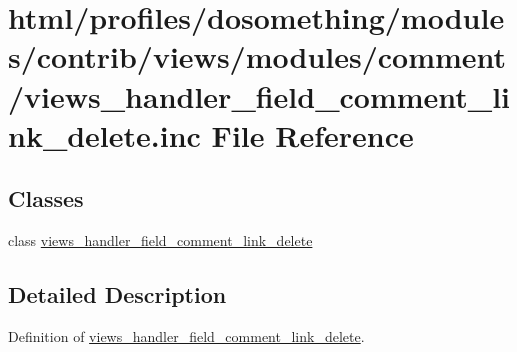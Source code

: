 \hypertarget{views__handler__field__comment__link__delete_8inc}{
\section{html/profiles/dosomething/modules/contrib/views/modules/comment/views\_\-handler\_\-field\_\-comment\_\-link\_\-delete.inc File Reference}
\label{views__handler__field__comment__link__delete_8inc}
}
\subsection*{Classes}
\begin{DoxyCompactItemize}
\item 
class \hyperlink{classviews__handler__field__comment__link__delete}{views\_\-handler\_\-field\_\-comment\_\-link\_\-delete}
\end{DoxyCompactItemize}


\subsection{Detailed Description}
Definition of \hyperlink{classviews__handler__field__comment__link__delete}{views\_\-handler\_\-field\_\-comment\_\-link\_\-delete}. 